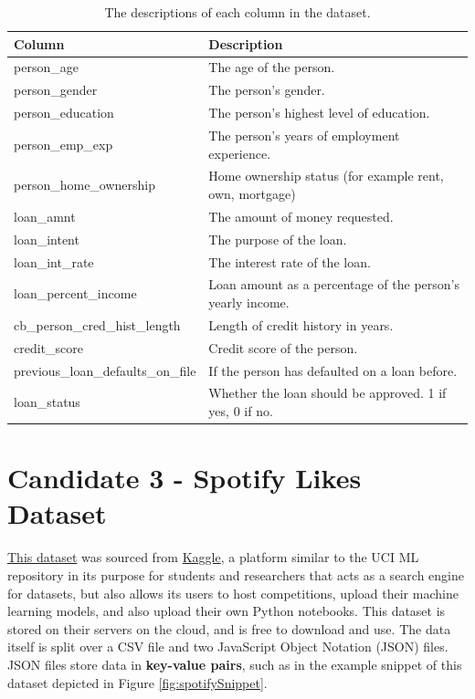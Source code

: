 \documentclass[12pt]{report}
\begin{document}
\begin{table}[H]
    \centering
        \begin{tabular}{ |p{}| p{}|}
            \hline
            \cellcolor{blue!25}Column & \cellcolor{blue!25}Description\\
            \hline
            person\_age & The age of the person.\\
            \hline
            person\_gender & The person's gender.\\
            \hline
            person\_education & The person's highest level of education.\\
            \hline
            person\_emp\_exp & The person's years of employment experience.\\
            \hline
            person\_home\_ownership & Home ownership status (for example rent, own, mortgage)\\
            \hline
            loan\_amnt & The amount of money requested.\\
            \hline
            loan\_intent & The purpose of the loan.\\
            \hline
            loan\_int\_rate & The interest rate of the loan.\\
            \hline
            loan\_percent\_income & Loan amount as a percentage of the person's yearly income.\\
            \hline
            cb\_person\_cred\_hist\_length & Length of credit history in years.\\
            \hline
            credit\_score & Credit score of the person.\\
            \hline
            previous\_loan\_defaults\_on\_file & If the person has defaulted on a loan before. \\
            \hline
            loan\_status & Whether the loan should be approved. 1 if yes, 0 if no.\\
            \hline
    \end{tabular}
    \caption{The descriptions of each column in the dataset.}\label{tab:Loan-Types}
\end{table}

\pagebreak

\section{Candidate 3 - Spotify Likes Dataset}
\href{https://www.kaggle.com/datasets/bricevergnou/spotify-recommendation/data}{This dataset} was sourced from \href{https://www.kaggle.com/datasets}{Kaggle}, a platform similar to the UCI ML repository in its purpose for students and researchers
that acts as a search engine for datasets, but also allows its users to host competitions, upload their machine learning models, and also upload 
their own Python notebooks. This dataset is stored on their servers on the cloud, and is free to download and use. The data itself is split over 
a CSV file and two JavaScript Object Notation (JSON) files. JSON files 
store data in \textbf{key-value pairs}, such as in the example snippet of this dataset depicted in Figure \ref{fig:spotifySnippet}.  
\end{document}
